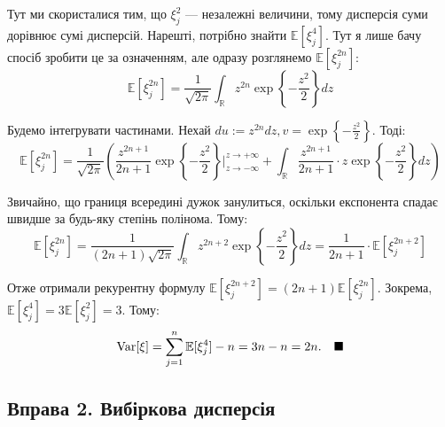 \documentclass{hw_template}
\begin{document}
Тут ми скористалися тим, що $\xi_j^2$ --- незалежні величини, тому дисперсія суми дорівнює сумі дисперсій. Нарешті, потрібно знайти $\mathbb{E}[\xi_j^4]$. Тут я лише бачу спосіб зробити це за означенням, але одразу розглянемо $\mathbb{E}[\xi_j^{2n}]$:
\begin{equation*}
    \mathbb{E}[\xi_j^{2n}] = \frac{1}{\sqrt{2\pi}}\int_{\mathbb{R}} z^{2n} \exp\left\{-\frac{z^2}{2}\right\}dz
\end{equation*}

Будемо інтегрувати частинами. Нехай $du := z^{2n}dz, v = \exp\left\{-\frac{z^2}{2}\right\}$. Тоді:
\begin{equation*}
    \mathbb{E}[\xi_j^{2n}] = \frac{1}{\sqrt{2\pi}} \left( \frac{z^{2n+1}}{2n+1}\exp\left\{-\frac{z^2}{2}\right\}\Big|_{z \to -\infty}^{z \to +\infty} + \int_{\mathbb{R}}\frac{z^{2n+1}}{2n+1} \cdot z \exp\left\{-\frac{z^2}{2}\right\}dz \right)
\end{equation*}

Звичайно, що границя всередині дужок занулиться, оскільки експонента спадає швидше за будь-яку степінь полінома. Тому:
\begin{equation*}
    \mathbb{E}[\xi_j^{2n}] = \frac{1}{(2n+1)\sqrt{2\pi}}\int_{\mathbb{R}}z^{2n+2}\exp\left\{-\frac{z^2}{2}\right\}dz = \frac{1}{2n+1} \cdot \mathbb{E}[\xi_j^{2n+2}]
\end{equation*}

Отже отримали рекурентну формулу $\mathbb{E}[\xi_j^{2n+2}] = (2n+1)\mathbb{E}[\xi_j^{2n}]$. Зокрема, $\mathbb{E}[\xi_j^4] = 3\mathbb{E}[\xi_j^2] = 3$. Тому:
\begin{equation*}
    \text{Var}[\xi] = \sum_{j=1}^n \mathbb{E}[\xi_j^4] - n = 3n - n = 2n. \quad \hfill \blacksquare
\end{equation*}

\subsection{Вправа 2. Вибіркова дисперсія}
\end{document}
